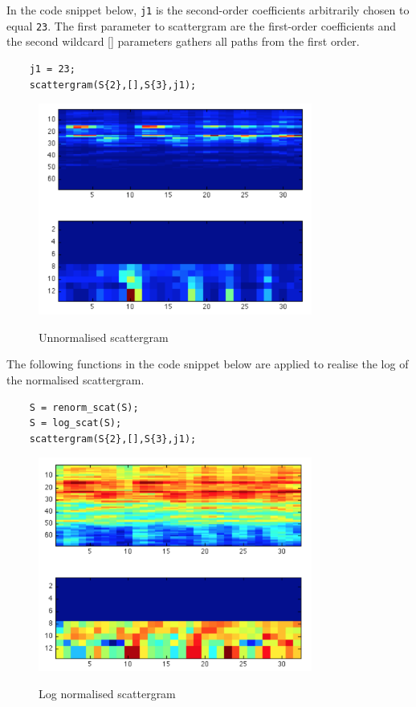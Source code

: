 In the code snippet below, \texttt{j1} is the second-order coefficients arbitrarily chosen to equal \texttt{23}.  The first parameter to scattergram are the first-order coefficients and the second wildcard [] parameters gathers all paths from the first order.  
\begin{verbatim}
    j1 = 23;
    scattergram(S{2},[],S{3},j1);
\end{verbatim}

\begin{figure}
\centering
  \includegraphics[width=9cm]{thesis/images/wscat0}\\
  \caption{Unnormalised scattergram}\label{fig_c3_sgram00}
\end{figure}

The following functions in the code snippet below are applied to realise the log of the normalised scattergram.
\begin{verbatim}
    S = renorm_scat(S);
    S = log_scat(S);
    scattergram(S{2},[],S{3},j1);
\end{verbatim}

\begin{figure}
\centering
  \includegraphics[width=9cm]{thesis/images/wscat1}\\
  \caption{Log normalised scattergram}\label{fig_c3_sgram01}
\end{figure}

